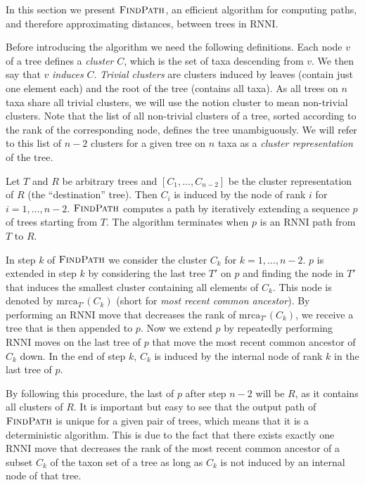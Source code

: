 \documentclass{amsart}
\newcommand{\mrca}{\mathrm{mrca}}
\newcommand{\rnni}{\mathrm{RNNI}}
\newcommand{\findpath}{\textsc{FindPath}}
\begin{document}
In this section we present $\findpath$, an efficient algorithm for computing paths, and therefore approximating distances, between trees in $\rnni$.

Before introducing the algorithm we need the following definitions.
Each node $v$ of a tree defines a \emph{cluster} $C$, which is the set of taxa descending from $v$.
We then say that $v$ \emph{induces} $C$.
\emph{Trivial clusters} are clusters induced by leaves (contain just one element each) and the root of the tree (contains all taxa).
As all trees on $n$ taxa share all trivial clusters, we will use the notion cluster to mean non-trivial clusters.
Note that the list of all non-trivial clusters of a tree, sorted according to the rank of the corresponding node, defines the tree unambiguously.
We will refer to this list of $n-2$ clusters for a given tree on $n$ taxa as a \emph{cluster representation} of the tree.

Let $T$ and $R$ be arbitrary trees and $[C_1, \ldots, C_{n-2}]$ be the cluster representation of $R$ (the ``destination'' tree).
Then $C_i$ is induced by the node of rank $i$ for $i = 1, \ldots, n-2$.
$\findpath$ computes a path by iteratively extending a sequence $p$ of trees starting from $T$.
The algorithm terminates when $p$ is an $\rnni$ path from $T$ to $R$.

In step $k$ of $\findpath$ we consider the cluster $C_k$ for $k = 1, \ldots, n-2$.
$p$ is extended in step $k$ by considering the last tree $T'$ on $p$ and finding the node in $T'$ that induces the smallest cluster containing all elements of $C_k$.
This node is denoted by $\mrca_{T'}(C_k)$ (short for \emph{most recent common ancestor}).
By performing an $\rnni$ move that decreases the rank of $\mrca_{T'}(C_k)$, we receive a tree that is then appended to $p$.
Now we extend $p$ by repeatedly performing $\rnni$ moves on the last tree of $p$ that move the most recent common ancestor of $C_k$ down.
In the end of step $k$, $C_k$ is induced by the internal node of rank $k$ in the last tree of $p$.

By following this procedure, the last of $p$ after step $n-2$ will be $R$, as it contains all clusters of $R$.
It is important but easy to see that the output path of $\findpath$ is unique for a given pair of trees, which means that it is a deterministic algorithm.
This is due to the fact that there exists exactly one $\rnni$ move that decreases the rank of the most recent common ancestor of a subset $C_k$ of the taxon set of a tree as long as $C_k$ is not induced by an internal node of that tree.
\end{document}
